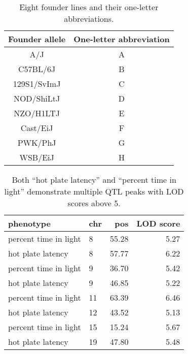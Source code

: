 \documentclass{book}
\begin{document}
\begin{table}
  \caption{Eight founder lines and their one-letter abbreviations.}
  \label{table-letters}
\begin{center}
\small
  \begin{tabular}{ c | c }
    \hline
    Founder allele & One-letter abbreviation \\ \hline
    A/J & A \\
    C57BL/6J & B \\
    129S1/SvImJ & C \\
    NOD/ShiLtJ & D\\
    NZO/H1LTJ & E\\
    Cast/EiJ & F\\
    PWK/PhJ & G\\
    WSB/EiJ & H\\
    \hline
  \end{tabular}

\end{center}
  \end{table}

\clearpage

\begin{table}
\caption{Both ``hot plate latency'' and ``percent time in light''
  demonstrate multiple QTL peaks with LOD scores above 5.}
  \label{table-peaks}
\begin{center}
\begin{tabular}{l|lrr}
  \hline
phenotype & chr & pos & LOD score \\
   \hline
percent time in light & 8 & 55.28 & 5.27 \\
 hot plate latency & 8 & 57.77 & 6.22 \\
 percent time in light & 9 & 36.70 & 5.42 \\
 hot plate latency & 9 & 46.85 & 5.22 \\
 percent time in light & 11 & 63.39 & 6.46 \\
 hot plate latency & 12 & 43.52 & 5.13 \\
 percent time in light & 15 & 15.24 & 5.67 \\
 hot plate latency & 19 & 47.80 & 5.48 \\
   \hline
\end{tabular}
\end{center}
\end{table}
\end{document}
